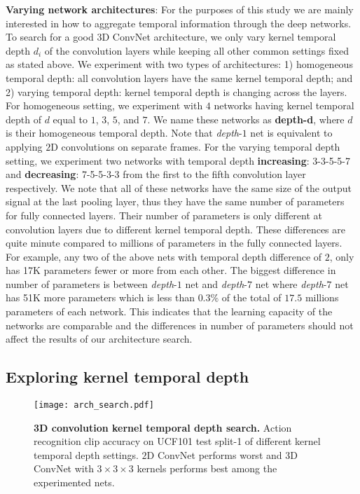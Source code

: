 \documentclass[10pt,twocolumn,letterpaper]{article}
\begin{document}
{\bf Varying network architectures}: For the purposes of this study we are mainly interested in how to aggregate temporal information through the deep networks. To search for a good 3D ConvNet architecture, we only vary kernel temporal depth $d_i$ of the convolution layers while keeping all other common settings fixed as stated above. We experiment with two types of architectures: 1) homogeneous temporal depth: all convolution layers have the same kernel temporal depth; and 2) varying temporal depth: kernel temporal depth is changing across the layers. For homogeneous setting, we experiment with $4$ networks having kernel temporal depth of $d$ equal to $1$, $3$, $5$, and $7$. We name these networks as {\bf depth-d}, where $d$ is their homogeneous temporal depth. Note that \emph{depth}-$1$ net is equivalent to applying $2$D convolutions on separate frames. For the varying temporal depth setting, we experiment two networks with temporal depth {\bf increasing}: 3-3-5-5-7 and {\bf decreasing}: 7-5-5-3-3 from the first to the fifth convolution layer respectively. We note that all of these networks have the same size of the output signal at the last pooling layer, thus they have the same number of parameters for fully connected layers. Their number of parameters is only different at convolution layers due to different kernel temporal depth. These differences are quite minute compared to millions of parameters in the fully connected layers. For example, any two of the above nets with temporal depth difference of $2$, only has 17K parameters fewer or more from each other. The biggest difference in number of parameters is between \emph{depth}-$1$ net and \emph{depth}-$7$ net where \emph{depth}-$7$ net has 51K more parameters which is less than $0.3\%$ of the total of $17.5$ millions parameters of each network. This indicates that the learning capacity of the networks are comparable and the differences in number of parameters should not affect the results of our architecture search.

\subsection{Exploring kernel temporal depth}
\label{sec:arch_search}

\begin{figure}
\begin{center}
   \texttt{[image: arch\_search.pdf]}
\end{center}
\vspace{-12pt}
   \caption{{\bf 3D convolution kernel temporal depth search.} Action recognition clip accuracy on UCF101 test split-1 of different kernel temporal depth settings. $2$D ConvNet performs worst and $3$D ConvNet with $3 \times 3 \times 3$ kernels performs best among the experimented nets.}
\label{fig:c3d_arch_search}
\vspace{-12pt}
\end{figure}
\end{document}
